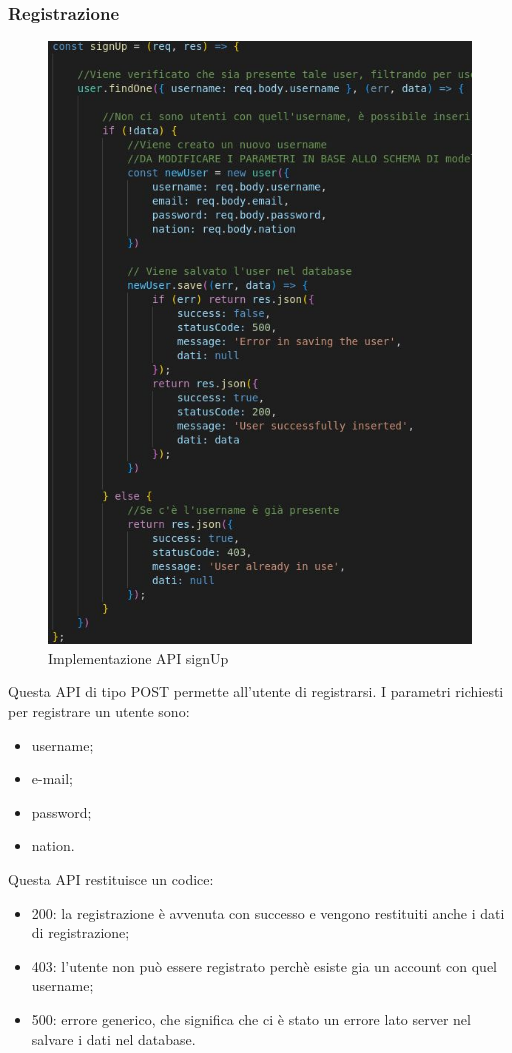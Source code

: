 \subsubsection{Registrazione}
\begin{figure}[!h]
\centering
\includegraphics[scale=0.4]{images/api_signup.jpg}
\caption{Implementazione API signUp}
\label{fig:api_signup}
\end{figure}
\noindent
Questa API di tipo POST permette all'utente di registrarsi. I parametri richiesti per registrare un utente sono:
\begin{itemize}
    \item username;
    \item e-mail;
    \item password;
    \item nation.
\end{itemize}
Questa API restituisce un codice:
\begin{itemize}
    \item 200: la registrazione è avvenuta con successo e vengono restituiti anche i dati di registrazione;
    \item 403: l'utente non può essere registrato perchè esiste gia un account con quel username;
    \item 500: errore generico, che significa che ci è stato un errore lato server nel salvare i dati nel database.
\end{itemize}

